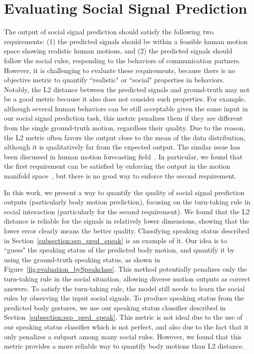 
\section{Evaluating Social Signal Prediction}
\label{section:evaluation}
The output of social signal prediction should satisfy the following two requirements: (1) the predicted signals should be within a feasible human motion space showing realistic human motions, and (2) the predicted signals should follow the social rules, responding to the behaviors of communication partners. However, it is challenging to evaluate these requirements, because there is no objective metric to quantify ``realistic" or ``social" properties in behaviors. Notably, the L2 distance between the predicted signals and ground-truth may not be a good metric because it also does not consider such properties. For example, although several human behaviors can be still acceptable given the same input in our social signal prediction task, this metric penalizes them if they are different from the single ground-truth motion, regardless their quality. Due to the reason, the L2 metric often favors the output close to the mean of the data distribution, although it is qualitatively far from the expected output. The similar issue has been discussed in human motion forecasting field~\cite{mnih2012conditional, Fragkiadaki_2015_ICCV, jain2016structural, zhou2018autoconditioned}. In particular, we found that the first requirement can be satisfied by enforcing the output in the motion manifold space~\cite{holden2016deep}, but there is no good way to enforce the second requirement.


In this work, we present a way to quantify the quality of social signal prediction outputs (particularly body motion prediction), focusing on the turn-taking rule in social interaction (particularly for the second requirement). We found that the L2 distance is reliable for the signals in relatively lower dimensions, showing that the lower error clearly means the better quality. Classifying speaking status described in Section~\ref{subsection:ssp_pred_speak} is an example of it.  Our idea is to ``guess" the speaking status of the predicted body motion, and quantify it by using the ground-truth speaking status, as shown in Figure~\ref{fig:evaluation_bySpeakclass}. This method potentially penalizes only the turn-taking rule in the social situation, allowing diverse motion outputs as correct answers. To satisfy the turn-taking rule, the model still needs to learn the social rules by observing the input social signals. To produce speaking status from the predicted body gestures, we use our speaking status classifier described in Section~\ref{subsection:ssp_pred_speak}. This metric is not ideal due to the use of our speaking status classifier which is not perfect, and also due to the fact that it only penalizes a subpart among many social rules. However, we found that this metric provides a more reliable way to quantify body motions than L2 distance. 


